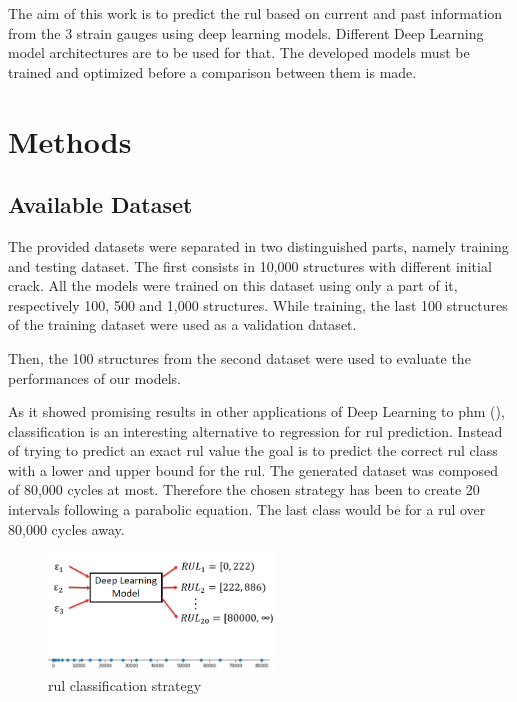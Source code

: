 \documentclass[conference]{IEEEtran}
\begin{document}
The aim of this work is to predict the \gls{rul} based on current and past information from the 3 strain gauges using deep learning models. Different Deep Learning model architectures are to be used for that. The developed models must be trained and optimized before a comparison between them is made.

\section{Methods}
\label{sec:methods}

\noindent
\subsection{Available Dataset}

The provided datasets were separated in two distinguished parts, namely training and testing dataset. The first consists in 10,000 structures with different initial crack. All the models were trained on this dataset using only a part of it, respectively 100, 500 and 1,000 structures. While training, the last 100 structures of the training dataset were used as a validation dataset.

Then, the 100 structures from the second dataset were used to evaluate the performances of our models.


As it showed promising results in other applications of Deep Learning to \gls{phm} (\cite{Liu2019a, Xiao2016}), classification is an interesting alternative to regression for \gls{rul} prediction. Instead of trying to predict an exact \gls{rul} value the goal is to predict the correct \gls{rul} class with a lower and upper bound for the \gls{rul}. The generated dataset was composed of 80,000 cycles at most. Therefore the chosen strategy has been to create 20 intervals following a parabolic equation. The last class would be for a \gls{rul} over 80,000 cycles away.


\begin{figure}[htp]
	\centering
	\includegraphics[width=6cm]{RUL_Classification.png}
	\caption{\gls{rul} classification strategy}
	\label{fig:RNN-classification}
\end{figure}
\end{document}
